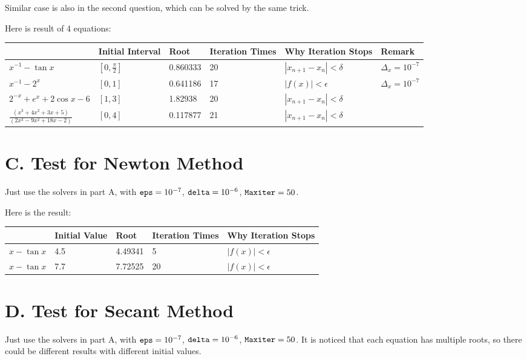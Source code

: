 \documentclass[a4paper]{article}
\begin{document}
Similar case is also in the second question, which can be solved by the same trick.

Here is result of 4 equations:
\begin{table}[!ht]
    \centering
    \begin{tabular}{|l|l|l|l|l|l|}
    \hline
        ~ & Initial Interval& Root & Iteration Times & Why Iteration Stops & Remark \\ \hline
        $x^{-1} - \tan x$ & $[0,\frac{\pi}{2}]$ & 0.860333 & 20 & $|x_{n+1}-x_n| < \delta$ & $\Delta_x = 10^{-7}$ \\ \hline
        $x^{-1} - 2^x$ & $[0,1]$ & 0.641186 & 17 & $|f(x)| < \epsilon$ & $\Delta_x = 10^{-7}$ \\ \hline
        $2^{-x} + e^{x} + 2\cos{x} - 6$ & $[1,3]$ & 1.82938 & 20 & $|x_{n+1}-x_n| < \delta$ & ~ \\ \hline
        $\frac{(x^3 + 4x^2 + 3x + 5)}{(2x^3 - 9x^2 + 18x - 2)}$ & $[0,4]$ & 0.117877 & 21 & $|x_{n+1}-x_n| < \delta$ & ~ \\ \hline
    \end{tabular}
\end{table}

\section*{C. Test for Newton Method}
Just use the solvers in part A, with $\verb|eps| = 10^{-7}$, $\verb|delta| = 10^{-6}$, $\verb|Maxiter| = 50$.

Here is the result:
\begin{table}[!ht]
    \centering
    \begin{tabular}{|l|l|l|l|l|}
    \hline
        ~ & Initial Value& Root & Iteration Times & Why Iteration Stops\\ \hline
        $x - \tan x$ & 4.5 & 4.49341 & 5 & $|f(x)| < \epsilon$ \\ \hline
        $x - \tan x$ & 7.7 & 7.72525 & 20 & $|f(x)| < \epsilon$ \\ \hline
    \end{tabular}
\end{table}

\section*{D. Test for Secant Method}
Just use the solvers in part A, with $\verb|eps| = 10^{-7}$, $\verb|delta| = 10^{-6}$, $\verb|Maxiter| = 50$. It is noticed that each equation has multiple roots,
 so there could be different results with different initial values.
\end{document}
